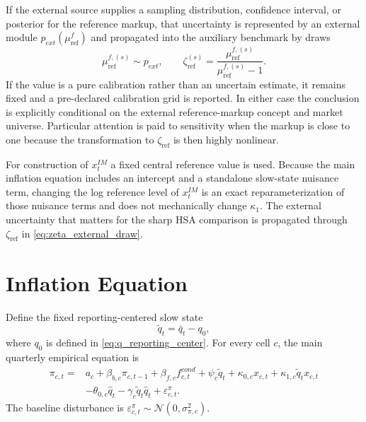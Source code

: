 \documentclass[11pt]{article}
\newcommand{\Normal}{\mathcal{N}}
\begin{document}
If the external source supplies a sampling distribution, confidence interval, or posterior for the reference markup, that uncertainty is represented by an external module $p_{ext}(\mu_{\mathrm{ref}}^f)$ and propagated into the auxiliary benchmark by draws
\begin{equation}
\mu_{\mathrm{ref}}^{f,(s)}\sim p_{ext},
\qquad
\zeta_{\mathrm{ref}}^{(s)}
=
\frac{\mu_{\mathrm{ref}}^{f,(s)}}{\mu_{\mathrm{ref}}^{f,(s)}-1}.
\label{eq:zeta_external_draw}
\end{equation}
If the value is a pure calibration rather than an uncertain estimate, it remains fixed and a pre-declared calibration grid is reported. In either case the conclusion is explicitly conditional on the external reference-markup concept and market universe. Particular attention is paid to sensitivity when the markup is close to one because the transformation to $\zeta_{\mathrm{ref}}$ is then highly nonlinear.

For construction of $x_t^{IM}$ a fixed central reference value is used. Because the main inflation equation includes an intercept and a standalone slow-state nuisance term, changing the log reference level of $x_t^{IM}$ is an exact reparameterization of those nuisance terms and does not mechanically change $\kappa_1$. The external uncertainty that matters for the sharp HSA comparison is propagated through $\zeta_{\mathrm{ref}}$ in \cref{eq:zeta_external_draw}.

\section{Inflation Equation}

Define the fixed reporting-centered slow state
\begin{equation}
\tilde q_t=\bar q_t-q_0,
\label{eq:q_tilde}
\end{equation}
where $q_0$ is defined in \cref{eq:q_reporting_center}. For every cell $c$, the main quarterly empirical equation is
\begin{equation}
\boxed{
\begin{aligned}
\pi_{c,t}
={}&a_c+\beta_{b,c}\pi_{c,t-1}+\beta_{f,c}f_{c,t}^{cond}
+\psi_c\tilde q_t
+\kappa_{0,c}x_{c,t}
+\kappa_{1,c}\tilde q_tx_{c,t}\\
&-\theta_{0,c}\hat q_t
-\gamma_c\tilde q_t\hat q_t
+\varepsilon_{c,t}^{\pi}.
\end{aligned}
}
\label{eq:inflation_equation}
\end{equation}
The baseline disturbance is $\varepsilon_{c,t}^{\pi}\sim\Normal(0,\sigma_{\pi,c}^2)$.
\end{document}

